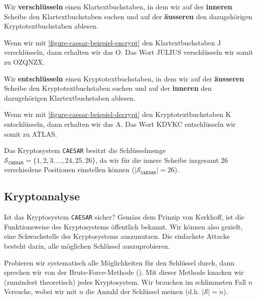 Wir \textbf{verschlüsseln} einen Klartextbuchstaben, in dem wir auf der \textbf{inneren} Scheibe den Klartextbuchstaben suchen und auf der \textbf{äusseren} den dazugehörigen Kryptotextbuchstaben ablesen.

\begin{example}
Wenn wir mit \autoref{figure-caesar-beispiel-encrypt} den Klartextbuchstaben J verschlüsseln, dann erhalten wir das O. Das Wort JULIUS verschlüsseln wir somit zu OZQNZX.
\end{example}

Wir \textbf{entschlüsseln} einen Kryptotextbuchstaben, in dem wir auf der \textbf{äusseren} Scheibe den Kryptotextbuchstaben suchen und auf der \textbf{inneren} den dazugehörigen Klartextbuchstaben ablesen.

\begin{example}
Wenn wir mit \autoref{figure-caesar-beispiel-decrypt} den Kryptotextbuchstaben K entschlüsseln, dann erhalten wir das A. Das Wort KDVKC entschlüsseln wir somit zu ATLAS.
\end{example}

\begin{definition}
Das Kryptosystem \texttt{CAESAR} besitzt die Schlüsselmenge $\mathscr{S}_{\texttt{CAESAR}} = \{1, 2, 3, \dots , 24, 25, 26\}$, da wir für die innere Scheibe insgesamt $26$ verschiedene Positionen einstellen können ($|\mathscr{S}_{\texttt{CAESAR}}| = 26$).
\end{definition}

\subsection{Kryptoanalyse}

Ist das Kryptosystem \texttt{CAESAR} sicher? Gemäss dem Prinzip von Kerkhoff, ist die Funktionsweise des Kryptosystems öffentlich bekannt. Wir können also gezielt, eine Schwachstelle des Kryptosystems auszunutzen. Die einfachste Attacke besteht darin, alle möglichen Schlüssel auszuprobieren.

\begin{definition}
	Probieren wir systematisch alle Möglichkeiten für den Schlüssel durch, dann sprechen wir von der Brute-Force-Methode (). Mit dieser Methode knacken wir (zumindest theoretisch) jedes Kryptosystem. Wir brauchen im schlimmsten Fall $n$ Versuche, wobei wir mit $n$ die Anzahl der Schlüssel meinen (d.h. $|\mathscr{S}|=n$).
\end{definition}


